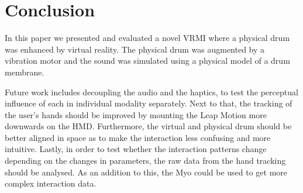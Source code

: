 \documentclass{vgtc}
\begin{document}
\section{Conclusion}\label{sec:conc}

In this paper we presented and evaluated a novel VRMI where a physical drum was enhanced by virtual reality. The physical drum was augmented by a vibration motor and the sound was simulated using a physical model of a drum membrane.

Future work includes decoupling the audio and the haptics, to test the perceptual influence of each in individual modality separately. Next to that, the tracking of the user's hands should be improved by mounting the Leap Motion more downwards on the HMD. Furthermore, the virtual and physical drum should be better aligned in space as to make the interaction less confusing and more intuitive. Lastly, in order to test whether the interaction patterns change depending on the changes in parameters, the raw data from the hand tracking should be analysed. As an addition to this, the Myo could be used to get more complex interaction data.


%

%
%
%


\end{document}
